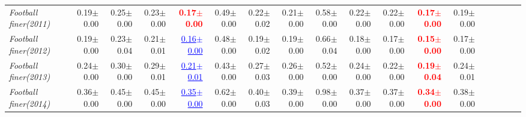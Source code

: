 \documentclass[nohyperref]{article}
\theoremstyle{plain}
\theoremstyle{definition}
\theoremstyle{remark}
\newcommand{\red}[1]{\textcolor{red}{\textbf{#1}}}
\newcommand{\blue}[1]{\textcolor{blue}{\underline{#1}}}
\begin{document}
\begin{table*}[!ht]
{\begin{tabular}{lrrrrrrrrrrrrrrrrr}
			{\it Football finer(2011)} & 0.19$\pm$0.00 & 0.25$\pm$0.00 & 0.23$\pm$0.00 & \red{0.17$\pm$0.00} & 0.49$\pm$0.00 & 0.22$\pm$0.02 & 0.21$\pm$0.00 & 0.58$\pm$0.00 & 0.22$\pm$0.00 & 0.22$\pm$0.00 & \red{0.17$\pm$0.00} & 0.19$\pm$0.00 \\
			{\it Football finer(2012)} & 0.19$\pm$0.00 & 0.23$\pm$0.04 & 0.21$\pm$0.01 & \blue{0.16$\pm$0.00} & 0.48$\pm$0.00 & 0.19$\pm$0.02 & 0.19$\pm$0.00 & 0.66$\pm$0.04 & 0.18$\pm$0.00 & 0.17$\pm$0.00 & \red{0.15$\pm$0.00} & 0.17$\pm$0.00 \\
			{\it Football finer(2013)} & 0.24$\pm$0.00 & 0.30$\pm$0.00 & 0.29$\pm$0.01 & \blue{0.21$\pm$0.01} & 0.43$\pm$0.00 & 0.27$\pm$0.03 & 0.26$\pm$0.00 & 0.52$\pm$0.00 & 0.24$\pm$0.00 & 0.22$\pm$0.00 & \red{0.19$\pm$0.04} & 0.24$\pm$0.01 \\
			{\it Football finer(2014)} & 0.36$\pm$0.00 & 0.45$\pm$0.00 & 0.45$\pm$0.00 & \blue{0.35$\pm$0.00} & 0.62$\pm$0.00 & 0.40$\pm$0.03 & 0.39$\pm$0.00 & 0.98$\pm$0.00 & 0.37$\pm$0.00 & 0.37$\pm$0.00 & \red{0.34$\pm$0.00} & 0.38$\pm$0.00 \\
\bottomrule
\end{tabular}}
\end{table*}
\end{document}
